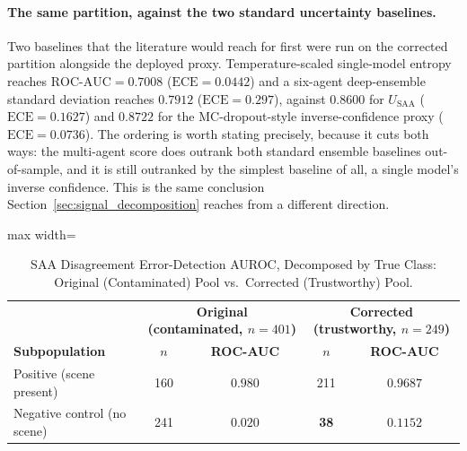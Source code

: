 \documentclass[12pt,a4paper]{report}
\begin{document}
\paragraph{The same partition, against the two standard uncertainty baselines.} Two baselines that the literature would reach for first were run on the corrected partition alongside the deployed proxy. Temperature-scaled single-model entropy reaches $\text{ROC-AUC}=0.7008$ ($\text{ECE}=0.0442$) and a six-agent deep-ensemble standard deviation reaches $0.7912$ ($\text{ECE}=0.297$), against $0.8600$ for $U_{\text{SAA}}$ ($\text{ECE}=0.1627$) and $0.8722$ for the MC-dropout-style inverse-confidence proxy ($\text{ECE}=0.0736$). The ordering is worth stating precisely, because it cuts both ways: the multi-agent score does outrank both standard ensemble baselines out-of-sample, and it is still outranked by the simplest baseline of all, a single model's inverse confidence. This is the same conclusion Section~\ref{sec:signal_decomposition} reaches from a different direction.

\begin{table}[!htbp]
\centering
\caption{SAA Disagreement Error-Detection AUROC, Decomposed by True Class: Original (Contaminated) Pool vs.\ Corrected (Trustworthy) Pool.}
\label{tab:negative_control_gap}
\begin{adjustbox}{max width=\linewidth}
\begin{tabular}{lcc|cc}
\toprule
& \multicolumn{2}{c|}{\textbf{Original (contaminated, $n{=}401$)}} & \multicolumn{2}{c}{\textbf{Corrected (trustworthy, $n{=}249$)}} \\
\textbf{Subpopulation} & \textbf{$n$} & \textbf{ROC-AUC} & \textbf{$n$} & \textbf{ROC-AUC} \\
\midrule
Positive (scene present) & 160 & $0.980$ & 211 & $\mathbf{0.9687}$ \\
Negative control (no scene) & 241 & $0.020$ & \textbf{38} & $0.1152$ \\
\bottomrule
\end{tabular}
\end{adjustbox}
\end{table}
\end{document}
